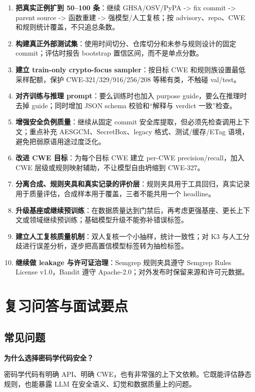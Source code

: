\documentclass[UTF8,11pt,fontset=none]{ctexart}
\begin{document}
\begin{enumerate}
  \item \textbf{把真实正例扩到 50--100 条}：继续 GHSA/OSV/PyPA -> fix commit -> parent source -> 函数重建 -> 强模型/人工复核；按 advisory、repo、CWE 和规则统计覆盖，不只追总条数。
  \item \textbf{构建真正外部测试集}：使用时间切分、仓库切分和未参与规则设计的固定 commit；评估时报告 bootstrap 置信区间，而不是单点分数。
  \item \textbf{建立 train-only crypto-focus sampler}：按目标 CWE 和规则族设置最低采样配额，保护 CWE-321/329/916/256/208 等稀有类，不触碰 val/test。
  \item \textbf{对齐训练与推理 prompt}：要么训练时也加入 purpose guide，要么在推理时去掉 guide；同时增加 JSON schema 校验和“解释与 verdict 一致”检查。
  \item \textbf{增强安全负例质量}：继续从固定 commit 安全库提取，但必须先检查调用上下文；重点补充 AESGCM、SecretBox、legacy 格式、测试/缓存/ETag 语境，避免把弱原语用途过度泛化。
  \item \textbf{改进 CWE 目标}：为每个目标 CWE 建立 per-CWE precision/recall，加入 CWE 层级或规则映射辅助，不让模型自由坍缩到 CWE-327。
  \item \textbf{分离合成、规则夹具和真实记录的评价层}：规则夹具用于工具回归，真实记录用于质量评估，合成样本用于覆盖，三者不能共用一个 headline。
  \item \textbf{升级基座或继续预训练}：在数据质量达到门禁后，再考虑更强基座、更长上下文或领域继续预训练；基础模型升级不能弥补错误标签。
  \item \textbf{建立人工复核质量机制}：双人复核一个小抽样，统计一致性；对 K3 与人工分歧进行误差分析，逐步把高置信模型标签转为抽检标签。
  \item \textbf{继续做 leakage 与许可证治理}：Semgrep 规则夹具遵守 Semgrep Rules License v1.0，Bandit 遵守 Apache-2.0；对外发布时保留来源和许可元数据。
\end{enumerate}

\section{复习问答与面试要点}

\subsection{常见问题}

\textbf{为什么选择密码学代码安全？}

密码学代码有明确 API、明确 CWE，也有非常强的上下文依赖。它既能评估静态规则，也能暴露 LLM 在安全语义、幻觉和数据质量上的问题。
\end{document}
